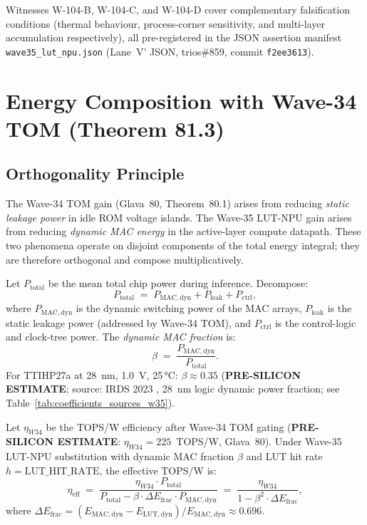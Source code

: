Witnesses W-104-B, W-104-C, and W-104-D cover complementary falsification
conditions (thermal behaviour, process-corner sensitivity, and multi-layer
accumulation respectively), all pre-registered in the JSON assertion manifest
\texttt{wave35\_lut\_npu.json} (Lane~V' JSON, trios\#859, commit \texttt{f2ee3613}).

\section{Energy Composition with Wave-34 TOM (Theorem 81.3)}
\label{sec:energy_composition}

\subsection{Orthogonality Principle}

The Wave-34 TOM gain (Glava~80, Theorem~80.1) arises from reducing
\emph{static leakage power} in idle ROM voltage islands.  The Wave-35
LUT-NPU gain arises from reducing \emph{dynamic MAC energy} in the active-layer
compute datapath.  These two phenomena operate on disjoint components of
the total energy integral; they are therefore orthogonal and compose
multiplicatively.

\begin{definition}
\label{def:energy_decomp_w35}
Let $P_{\mathrm{total}}$ be the mean total chip power during inference.
Decompose:
\[
  P_{\mathrm{total}} \;=\; P_{\mathrm{MAC,dyn}} + P_{\mathrm{leak}} + P_{\mathrm{ctrl}},
\]
where $P_{\mathrm{MAC,dyn}}$ is the dynamic switching power of the MAC arrays,
$P_{\mathrm{leak}}$ is the static leakage power (addressed by Wave-34 TOM),
and $P_{\mathrm{ctrl}}$ is the control-logic and clock-tree power.
The \emph{dynamic MAC fraction} is:
\[
  \beta \;=\; \frac{P_{\mathrm{MAC,dyn}}}{P_{\mathrm{total}}}.
\]
For TTIHP27a at 28~nm, 1.0~V, 25\,°C:
$\beta \approx 0.35$ (\textbf{PRE-SILICON ESTIMATE}; source: IRDS 2023
\cite{irds2023}, 28~nm logic dynamic power fraction; see
Table~\ref{tab:coefficients_sources_w35}).
\end{definition}

\begin{definition}
\label{def:eta_eff_w35}
Let $\eta_{W34}$ be the TOPS/W efficiency after Wave-34 TOM gating
(\textbf{PRE-SILICON ESTIMATE}: $\eta_{W34} = 225$~TOPS/W, Glava~80).
Under Wave-35 LUT-NPU substitution with dynamic MAC fraction $\beta$ and
LUT hit rate $h = \mathrm{LUT\_HIT\_RATE}$, the effective TOPS/W is:
\[
  \eta_{\mathrm{eff}} \;=\; \frac{\eta_{W34} \cdot P_{\mathrm{total}}}{P_{\mathrm{total}} - \beta \cdot \Delta E_{\mathrm{frac}} \cdot P_{\mathrm{MAC,dyn}}}
  \;=\; \frac{\eta_{W34}}{1 - \beta^2 \cdot \Delta E_{\mathrm{frac}}},
\]
where $\Delta E_{\mathrm{frac}} = (E_{\mathrm{MAC,dyn}} - E_{\mathrm{LUT,dyn}}) / E_{\mathrm{MAC,dyn}} \approx 0.696$.
\end{definition}

